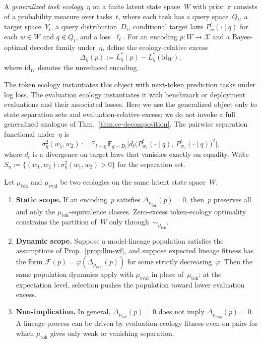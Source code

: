 \documentclass[twoside,11pt]{article}
\newcommand{\X}{\mathcal{X}}
\newcommand{\sigmasq}{\sigma^2}
\newcommand{\E}{\mathbb{E}}
\newcommand{\thmref}[1]{Thm.~\ref{#1}}
\newcommand{\propref}[1]{Prop.~\ref{#1}}
\begin{document}
\begin{definition}\label{def:gen-ecology}
A \emph{generalized task ecology}~$\eta$ on a finite latent state space~$W$ with prior~$\pi$ consists of a probability measure over tasks~$t$, where each task has a query space~$Q_t$, a target space~$Y_t$, a query distribution~$D_t$, conditional target laws $P^t_w(\cdot\mid q)$ for each $w\in W$ and $q\in Q_t$, and a loss~$\ell_t$. For an encoding $p\colon W\to\X$ and a Bayes-optimal decoder family under~$\eta$, define the ecology-relative excess
\[
\Delta_\eta(p) := L^*_\eta(p) - L^*_\eta(\mathrm{id}_W),
\]
where $\mathrm{id}_W$ denotes the unreduced encoding.
\end{definition}

The token ecology instantiates this object with next-token prediction tasks under log loss. The evaluation ecology instantiates it with benchmark or deployment evaluations and their associated losses. Here we use the generalized object only to state separation sets and evaluation-relative excess; we do not invoke a full generalized analogue of \thmref{thm:ce-decomposition}. The pairwise separation functional under~$\eta$ is
\[
\sigmasq_\eta(w_1,w_2) := \E_{t\sim\eta}\,\E_{q\sim D_t}\bigl[d_t\bigl(P^t_{w_1}(\cdot\mid q),\,P^t_{w_2}(\cdot\mid q)\bigr)^2\bigr],
\]
where $d_t$ is a divergence on target laws that vanishes exactly on equality. Write $S_\eta := \{(w_1,w_2) : \sigmasq_\eta(w_1,w_2)>0\}$ for the separation set.

\begin{proposition}\label{prop:two-ecology-scope}
Let $\mu_{\mathrm{tok}}$ and $\mu_{\mathrm{eval}}$ be two ecologies on the same latent state space~$W$.
\begin{enumerate}[label=(\alph*)]
\item \textbf{Static scope.} If an encoding~$p$ satisfies $\Delta_{\mu_{\mathrm{tok}}}(p)=0$, then~$p$ preserves all and only the $\mu_{\mathrm{tok}}$-equivalence classes. Zero-excess token-ecology optimality constrains the partition of~$W$ only through~${\sim_{\mu_{\mathrm{tok}}}}$.

\item \textbf{Dynamic scope.} Suppose a model-lineage population satisfies the assumptions of \propref{prop:llm-wf}, and suppose expected lineage fitness has the form $\mathcal{F}(p)=\varphi(\Delta_{\mu_{\mathrm{eval}}}(p))$ for some strictly decreasing~$\varphi$. Then the same population dynamics apply with $\mu_{\mathrm{eval}}$ in place of~$\mu_{\mathrm{tok}}$: at the expectation level, selection pushes the population toward lower evaluation excess.

\item \textbf{Non-implication.} In general, $\Delta_{\mu_{\mathrm{tok}}}(p)=0$ does not imply $\Delta_{\mu_{\mathrm{eval}}}(p)=0$. A lineage process can be driven by evaluation-ecology fitness even on pairs for which $\mu_{\mathrm{tok}}$ gives only weak or vanishing separation.
\end{enumerate}
\end{proposition}
\end{document}
